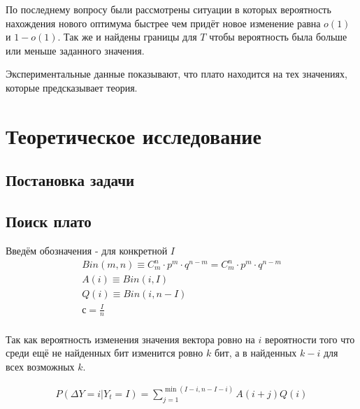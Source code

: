 \documentclass[times,specification,annotation]{itmo-student-thesis}
\begin{document}
    По последнему вопросу были рассмотрены ситуации в которых вероятность нахождения нового оптимума быстрее чем придёт новое изменение равна $o(1)$ и $1 - o(1)$.
    Так же и найдены границы для $T$ чтобы вероятность была больше или меньше заданного значения.

    Экспериментальные данные показывают, что плато находится на тех значениях, которые предсказывает теория.

    \chapter{Теоретическое исследование}

    \section{Постановка задачи}

    \section{Поиск плато}

    Введём обозначения - для конкретной $I$
    \begin{gather*}
        Bin(m, n) \equiv C_m^n \cdot p^{m} \cdot q^{n - m} = C_m^n \cdot p^{m} \cdot q^{n - m}\\
        A(i) \equiv Bin(i, I)\\
        Q(i) \equiv Bin(i, n - I)\\
        с = \frac{I}{n}\\
    \end{gather*}

    Так как вероятность изменения значения вектора ровно на $i$ вероятности того что среди ещё не найденных бит изменится ровно $k$ бит, а в найденных $k - i$ для всех возможных $k$.

    \begin{gather*}
        P(\Delta Y = i|Y_t=I) = \sum_{j=1}^{\min(I - i, n - I - i)} A(i + j)Q(i)
    \end{gather*}
\end{document}
